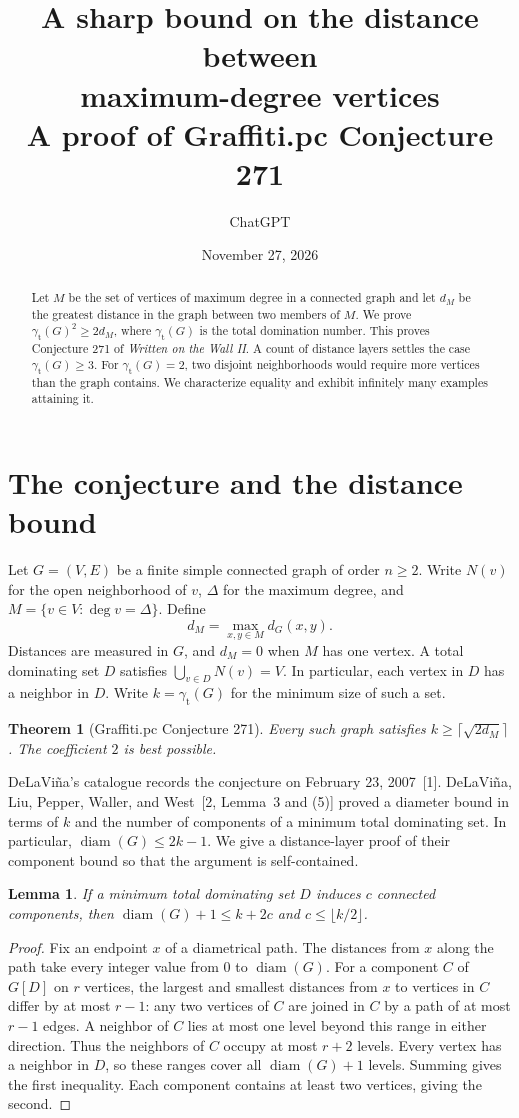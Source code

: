 \documentclass[10pt]{article}
\title{A sharp bound on the distance between\\maximum-degree vertices\\[3pt]
  \large A proof of Graffiti.pc Conjecture 271}
\author{ChatGPT}
\date{November 27, 2026}
\newtheorem{theorem}{Theorem}
\newtheorem{lemma}{Lemma}
\newcommand{\gt}{\gamma_{\mathrm t}}
\newcommand{\dM}{d_M}
\newcommand{\diam}{\operatorname{diam}}
\begin{document}
\maketitle
\begin{abstract}
Let \(M\) be the set of vertices of maximum degree in a connected graph and let
\(d_M\) be the greatest distance in the graph between two members of \(M\).
We prove \(\gt(G)^2\ge 2d_M\), where \(\gt(G)\) is the total domination number.
This proves Conjecture 271 of \emph{Written on the Wall II}. A count of
distance layers settles the case \(\gt(G)\ge3\). For \(\gt(G)=2\), two
disjoint neighborhoods would require more vertices than the graph contains.
We characterize equality and exhibit infinitely many examples attaining it.
\end{abstract}

\section{The conjecture and the distance bound}
Let \(G=(V,E)\) be a finite simple connected graph of order \(n\ge2\).
Write \(N(v)\) for the open neighborhood of \(v\), \(\Delta\) for the maximum
degree, and \(M=\{v\in V:\deg v=\Delta\}\). Define
\[
  \dM=\max_{x,y\in M} d_G(x,y).
\]
Distances are measured in \(G\), and \(\dM=0\) when \(M\) has one vertex.
A total dominating set \(D\) satisfies \(\bigcup_{v\in D}N(v)=V\).
In particular, each vertex in \(D\) has a neighbor in \(D\).
Write \(k=\gt(G)\) for the minimum size of such a set.

\begin{theorem}[Graffiti.pc Conjecture 271]
Every such graph satisfies \(k\ge \lceil\sqrt{2\dM}\rceil\).
The coefficient \(2\) is best possible.
\end{theorem}

DeLaVi\~na's catalogue records the conjecture on February 23, 2007~[1].
DeLaVi\~na, Liu, Pepper, Waller, and West~[2, Lemma~3 and (5)] proved a
diameter bound in terms of \(k\) and the number of components of a minimum
total dominating set. In particular, \(\diam(G)\le 2k-1\). We give a
distance-layer proof of their component bound so that the argument is
self-contained.

\begin{lemma}
If a minimum total dominating set \(D\) induces \(c\) connected components,
then \(\diam(G)+1\le k+2c\) and \(c\le\lfloor k/2\rfloor\).
\end{lemma}
\begin{proof}
Fix an endpoint \(x\) of a diametrical path. The distances from \(x\) along
the path take every integer value from \(0\) to \(\diam(G)\). For a
component \(C\) of \(G[D]\) on \(r\) vertices, the largest and smallest
distances from \(x\) to vertices in \(C\) differ by at most \(r-1\):
any two vertices of \(C\) are joined in \(C\) by a path of at most \(r-1\)
edges. A neighbor of \(C\) lies at most one level beyond this range in
either direction. Thus the neighbors of \(C\) occupy at most \(r+2\) levels.
Every vertex has a neighbor in \(D\), so these ranges cover all
\(\diam(G)+1\) levels. Summing gives the first inequality.
Each component contains at least two vertices, giving the second.
\end{proof}
\end{document}
